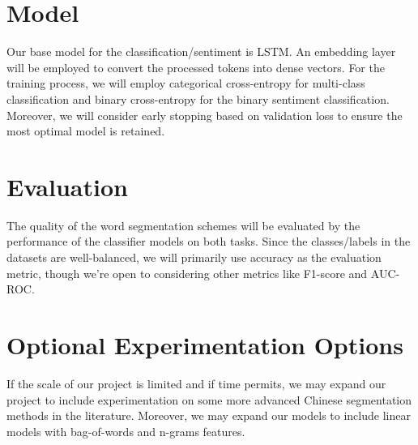 \documentclass[9pt, a4paper]{extarticle}
\begin{document}
\section{Model}

Our base model for the classification/sentiment is LSTM. An embedding layer will be employed to convert the processed tokens into dense vectors. For the training process, we will employ categorical cross-entropy for multi-class classification and binary cross-entropy for the binary sentiment classification. Moreover, we will consider early stopping based on validation loss to ensure the most optimal model is retained.

\section{Evaluation}

The quality of the word segmentation schemes will be evaluated by the performance of the classifier models on both tasks. Since the classes/labels in the datasets are well-balanced, we will primarily use accuracy as the evaluation metric, though we're open to considering other metrics like F1-score and AUC-ROC.

\section{Optional Experimentation Options}

If the scale of our project is limited and if time permits, we may expand our project to include experimentation on some more advanced Chinese segmentation methods in the literature. Moreover, we may expand our models to include linear models with bag-of-words and n-grams features.
\end{document}
